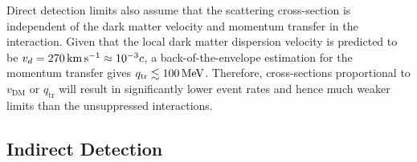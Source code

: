 Direct detection limits also assume that the scattering cross-section is independent of the dark matter velocity and momentum transfer in the interaction. Given that the local dark matter dispersion velocity is predicted to be $v_d = 270{\rm \,km}{\rm \,s}^{-1} \approx 10^{-3}c$, a back-of-the-envelope estimation for the momentum transfer gives $q_\mathrm{tr}\lesssim 100 {\rm \,MeV}$. Therefore, cross-sections proportional to $v_\mathrm{DM}$ or $q_\mathrm{tr}$ will result in significantly lower event rates and hence much weaker limits than the unsuppressed interactions. 

\subsection{Indirect Detection}

